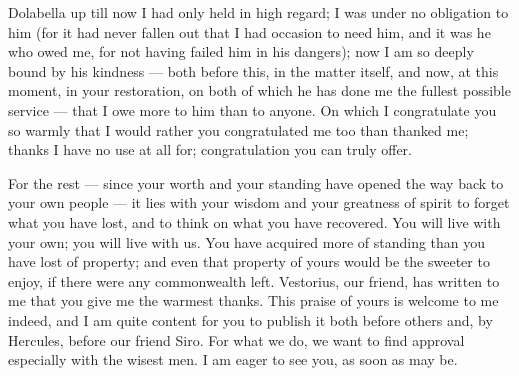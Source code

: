

 Dolabella up till now I had only held in high regard; I was under no obligation to him (for it had never fallen out that I had occasion to need him, and it was he who owed me, for not having failed him in his dangers); now I am so deeply bound by his kindness --- both before this, in the matter itself, and now, at this moment, in your restoration, on both of which he has done me the fullest possible service --- that I owe more to him than to anyone. On which I congratulate you so warmly that I would rather you congratulated me too than thanked me; thanks I have no use at all for; congratulation you can truly offer.

 For the rest --- since your worth and your standing have opened the way back to your own people --- it lies with your wisdom and your greatness of spirit to forget what you have lost, and to think on what you have recovered. You will live with your own; you will live with us. You have acquired more of standing than you have lost of property; and even that property of yours would be the sweeter to enjoy, if there were any commonwealth left. Vestorius, our friend, has written to me that you give me the warmest thanks. This praise of yours is welcome to me indeed, and I am quite content for you to publish it both before others and, by Hercules, before our friend Siro. For what we do, we want to find approval especially with the wisest men. I am eager to see you, as soon as may be.
